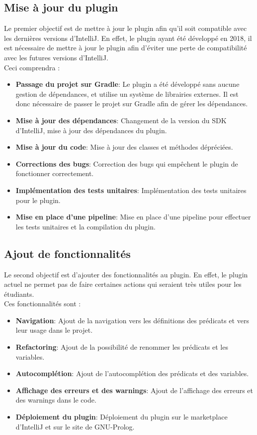 \subsection{Mise à jour du plugin}
\noindent
Le premier objectif est de mettre à jour le plugin afin qu'il soit compatible avec les dernières versions d'IntelliJ. En effet, le plugin ayant été développé en 2018, il est nécessaire de mettre à jour le plugin afin d'éviter une perte de compatibilité avec les futures versions d'IntelliJ.
\\ Ceci comprendra :
\begin{itemize}
    \item \textbf{Passage du projet sur Gradle}: Le plugin a été développé sans aucune gestion de dépendances, et utilise un système de librairies externes. Il est donc nécessaire de passer le projet sur Gradle afin de gérer les dépendances.
    \item \textbf{Mise à jour des dépendances}: Changement de la version du SDK d'IntelliJ, mise à jour des dépendances du plugin.
    \item \textbf{Mise à jour du code}: Mise à jour des classes et méthodes dépréciées.
    \item \textbf{Corrections des bugs}: Correction des bugs qui empêchent le plugin de fonctionner correctement.
    \item \textbf{Implémentation des tests unitaires}: Implémentation des tests unitaires pour le plugin.
    \item \textbf{Mise en place d'une pipeline}: Mise en place d'une pipeline pour effectuer les tests unitaires et la compilation du plugin.
\end{itemize}
\subsection{Ajout de fonctionnalités}
\noindent
Le second objectif est d'ajouter des fonctionnalités au plugin. En effet, le plugin actuel ne permet pas de faire certaines actions qui seraient très utiles pour les étudiants.
\\ Ces fonctionnalités sont :
\begin{itemize}
    \item \textbf{Navigation}: Ajout de la navigation vers les définitions des prédicats et vers leur usage dans le projet.
    \item \textbf{Refactoring}: Ajout de la possibilité de renommer les prédicats et les variables.
    \item \textbf{Autocomplétion}: Ajout de l'autocomplétion des prédicats et des variables.
    \item \textbf{Affichage des erreurs et des warnings}: Ajout de l'affichage des erreurs et des warnings dans le code.
    \item \textbf{Déploiement du plugin}: Déploiement du plugin sur le marketplace d'IntelliJ et sur le site de GNU-Prolog.
\end{itemize}

